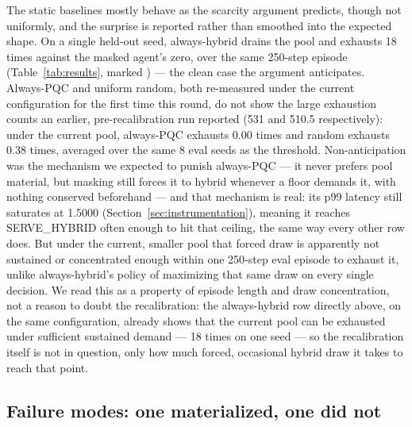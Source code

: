 \documentclass[conference]{IEEEtran}
\begin{document}
The static baselines mostly behave as the scarcity argument
predicts, though not uniformly, and the surprise is reported rather
than smoothed into the expected shape. On a single held-out seed,
always-hybrid drains the pool and exhausts 18 times against the
masked agent's zero, over the same 250-step episode
(Table~\ref{tab:results}, marked \textdagger) --- the clean case the
argument anticipates. Always-PQC and uniform random, both re-measured
under the current configuration for the first time this round, do
not show the large exhaustion counts an earlier, pre-recalibration
run reported (531 and 510.5 respectively): under the current pool,
always-PQC exhausts 0.00 times and random exhausts 0.38 times,
averaged over the same 8 eval seeds as the threshold. Non-anticipation
was the mechanism we expected to punish always-PQC --- it never
prefers pool material, but masking still forces it to hybrid
whenever a floor demands it, with nothing conserved beforehand --- and
that mechanism is real: its p99 latency still saturates at 1.5000
(Section~\ref{sec:instrumentation}), meaning it reaches SERVE\_HYBRID
often enough to hit that ceiling, the same way every other row does.
But under the current, smaller pool that forced draw is apparently
not sustained or concentrated enough within one 250-step eval episode
to exhaust it, unlike always-hybrid's policy of maximizing that same
draw on every single decision. We read this as a property of episode
length and draw concentration, not a reason to doubt the
recalibration: the always-hybrid row directly above, on the same
configuration, already shows that the current pool can be exhausted
under sufficient sustained demand --- 18 times on one seed --- so the
recalibration itself is not in question, only how much forced,
occasional hybrid draw it takes to reach that point.

\subsection{Failure modes: one materialized, one did not}
\end{document}
